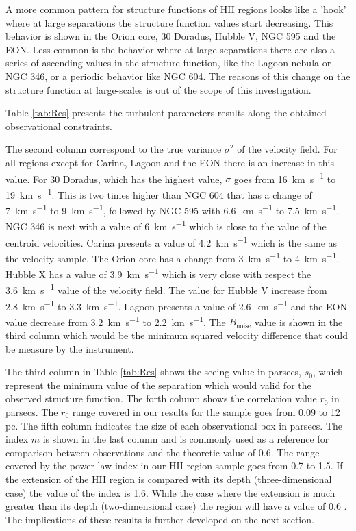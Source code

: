 \documentclass[fleqn,usenatbib, useAMS, a4paper]{mnras}
\begin{document}
A more common pattern for structure functions of HII regions looks like a 'hook' where at large separations the structure function values start decreasing.
This behavior is shown in the Orion core, 30 Doradus, Hubble V, NGC 595 and the EON.
Less common is the behavior where at large separations there are also a series of ascending values in the structure function, like the Lagoon nebula or NGC 346, or a periodic behavior like NGC 604.
The reasons of this change on the structure function at large-scales is out of the scope of this investigation.

Table \ref{tab:Res} presents the turbulent parameters results along the obtained observational constraints.

The second column correspond to the true variance \(\sigma^2\) of the velocity field.
For all regions except for Carina, Lagoon and the EON there is an increase in this value.
For 30 Doradus, which has the highest value, \(\sigma\) goes from \SI{16}{km.s^{-1}} to  \SI{19}{km.s^{-1}}.
This is two times higher than NGC 604 that has a change of \SI{7}{km.s^{-1}} to \SI{9}{km.s^{-1}}, followed by NGC 595 with \SI{6.6}{km.s^{-1}} to \SI{7.5}{km.s^{-1}}.
NGC 346 is next with a value of \SI{6}{km.s^{-1}} which is close to the value of the centroid velocities.
Carina presents a value of \SI{4.2}{km.s^{-1}} which is the same as the velocity sample.
The Orion core has a change from \SI{3}{km.s^{-1}} to \SI{4}{km.s^{-1}}.
Hubble X has a value of \SI{3.9}{km.s^{-1}} which is very close with respect the \SI{3.6}{km.s^{-1}} value of the velocity field.
The value for Hubble V increase from \SI{2.8}{km.s^{-1}} to \SI{3.3}{km.s^{-1}}.
Lagoon presents a value of \SI{2.6}{km.s^{-1}} and the EON value decrease from \SI{3.2}{km.s^{-1}} to \SI{2.2}{km.s^{-1}}.
The \(B_{\text{noise}}\) value is shown in the third column which would be the minimum squared velocity difference that could be measure by the instrument.

The third column in Table \ref{tab:Res} shows the seeing value in parsecs, \(s_0\), which represent the minimum value of the separation which would valid for the observed structure function. 
The forth column shows the correlation value \(r_0\) in parsecs.
The \(r_0\) range covered in our results for the sample goes from 0.09 to 12 pc.
The fifth column indicates the size of each observational box in parsecs.
The index \(m\) is shown in the last column and is commonly used as a reference for comparison between observations and the theoretic value of 0.6.
The range covered by the power-law index in our HII region sample goes from 0.7 to 1.5.
If the extension of the HII region is compared with its depth (three-dimensional case) the value of the index is 1.6. While the case where the extension is much greater than its depth (two-dimensional case) the region will have a value of 0.6 \citep{von1951methode, munch1958internal,1987ApJ...317..686O}.
The implications of these results is further developed on the next section.
\end{document}
